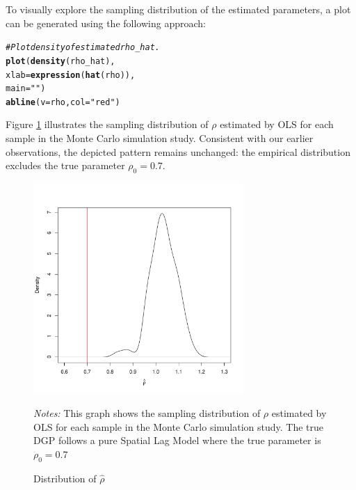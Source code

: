 \documentclass[english,12pt]{book}\usepackage[]{graphicx}\usepackage[]{xcolor}
\makeatletter
\newcommand{\hlstr}[1]{\textcolor[rgb]{0.192,0.494,0.8}{#1}}%
\newcommand{\hlcom}[1]{\textcolor[rgb]{0.678,0.584,0.686}{\textit{#1}}}%
\newcommand{\hlstd}[1]{\textcolor[rgb]{0.345,0.345,0.345}{#1}}%
\newcommand{\hlkwc}[1]{\textcolor[rgb]{0.333,0.667,0.333}{#1}}%
\newcommand{\hlkwd}[1]{\textcolor[rgb]{0.737,0.353,0.396}{\textbf{#1}}}%
\newenvironment{kframe}{%
 \def\at@end@of@kframe{}%
 \ifinner\ifhmode%
  \def\at@end@of@kframe{\end{minipage}}%
  \begin{minipage}{\columnwidth}%
 \fi\fi%
 \def\FrameCommand##1{\hskip\@totalleftmargin \hskip-\fboxsep
 \colorbox{shadecolor}{##1}\hskip-\fboxsep
     \hskip-\linewidth \hskip-\@totalleftmargin \hskip\columnwidth}%
 \MakeFramed {\advance\hsize-\width
   \@totalleftmargin\z@ \linewidth\hsize
   \@setminipage}}%
 {\par\unskip\endMakeFramed%
 \at@end@of@kframe}
\newenvironment{knitrout}{}{} %
\makeatother
\begin{document}
To visually explore the sampling distribution of the estimated parameters, a plot can be generated using the following approach:
\begin{knitrout}
\color{fgcolor}\begin{kframe}
\begin{alltt}
\hlcom{# Plot density of estimated rho_hat. }
\hlkwd{plot}\hlstd{(}\hlkwd{density}\hlstd{(rho_hat),}
     \hlkwc{xlab} \hlstd{=} \hlkwd{expression}\hlstd{(}\hlkwd{hat}\hlstd{(rho)),}
     \hlkwc{main} \hlstd{=} \hlstr{""}\hlstd{)}
\hlkwd{abline}\hlstd{(}\hlkwc{v} \hlstd{= rho,} \hlkwc{col} \hlstd{=} \hlstr{"red"}\hlstd{)}
\end{alltt}
\end{kframe}
\end{knitrout}

Figure \ref{fig:ols-rho-sim} illustrates the sampling distribution of $\rho$ estimated by OLS for each sample in the Monte Carlo simulation study. Consistent with our earlier observations, the depicted pattern remains unchanged: the empirical distribution excludes the true parameter $\rho_0 = 0.7$.

\begin{figure}[ht]
  \caption{Distribution of $\widehat{\rho}$}
    \label{fig:ols-rho-sim}
    \centering 
	\begin{minipage}{.9\linewidth}
\begin{knitrout}
\color{fgcolor}

{\centering \includegraphics[width=8cm,height=8cm]{figure/ols-rho-sim-1} 

}


\end{knitrout}
\footnotesize
		\emph{Notes:} This graph shows the sampling distribution of $\rho$ estimated by OLS for each sample in the Monte Carlo simulation study. The true DGP follows a pure Spatial Lag Model where the true parameter is $\rho_0 = 0.7$
	\end{minipage}	
\end{figure}
\end{document}
